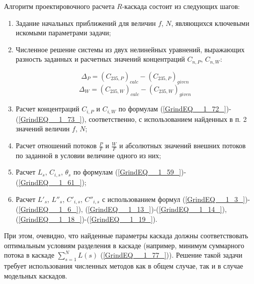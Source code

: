 Алгоритм проектировочного расчета $R$-каскада состоит из следующих шагов:

\begin{enumerate}
  \item Задание начальных приближений для величин $f$, $N$, являющихся ключевыми искомыми параметрами задачи; 
  \item Численное решение системы из двух нелинейных уравнений, выражающих разность заданных и расчетных значений концентраций $C_{n,P}$, $C_{n,W}$:
  
  \begin{equation}
  \label{dis_235P}
  \Delta_{P} = {(C_{235, P})}_{calc}-{(C_{235, P})}_{given}
\end{equation}
\begin{equation}
  \label{dis_235W}
  \Delta_{W} = {(C_{235, W})}_{calc}-{(C_{235, W})}_{given}
\end{equation}
    
  \item Расчет концентраций $C_{i,P}$ и $C_{i,W}$ по формулам (\ref{GrindEQ__1_72_})-(\ref{GrindEQ__1_73_}), соответственно, с использованием найденных в п. 2 значений величин $f$, $N$;
  \item Расчет отношений потоков  $\frac{P}{F}$ и $\frac{W}{F}$ и абсолютных значений внешних потоков по заданной в условии величине одного из них; 
  \item Расчет $L_{s}$, $C_{i, s}$, $\theta_{s}$ по формулам (\ref{GrindEQ__1_59_})-(\ref{GrindEQ__1_61_});
  \item Расчет ${L'}_{s}$, ${L''}_{s}$, $C'_{i, s} $, $C''_{i, s}$ с использованием формул (\ref{GrindEQ__1_3_})-(\ref{GrindEQ__1_6_}), (\ref{GrindEQ__1_13_})-(\ref{GrindEQ__1_14_}), (\ref{GrindEQ__1_18_})-(\ref{GrindEQ__1_19_}).
\end{enumerate}

При этом, очевидно, что найденные параметры каскада должны соответствовать оптимальным условиям разделения в каскаде (например, минимум суммарного потока в каскаде $\sum _{s=1}^{N}L(s)$ (\ref{GrindEQ__1_77_})). Решение такой задачи требует использования численных методов как в общем случае, так и в случае модельных каскадов. 

